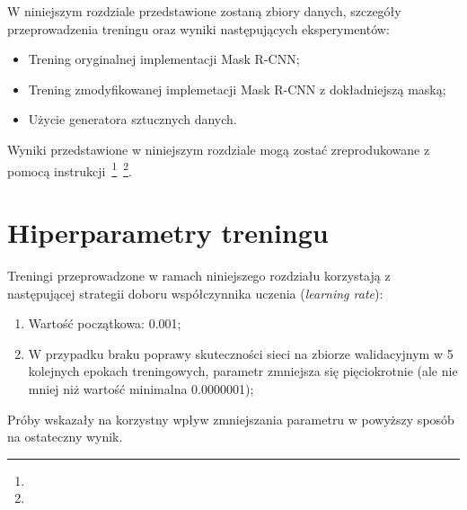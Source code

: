 
W niniejszym rozdziale przedstawione zostaną zbiory danych, szczegóły przeprowadzenia treningu oraz wyniki następujących eksperymentów:

\begin{itemize}
 \item Trening oryginalnej implementacji Mask R-CNN;
 \item Trening zmodyfikowanej implemetacji Mask R-CNN z dokładniejszą maską;
 \item Użycie generatora sztucznych danych.
\end{itemize}

Wyniki przedstawione w niniejszym rozdziale mogą zostać zreprodukowane z pomocą instrukcji~\footnote{}~\footnote{}.

\section{Hiperparametry treningu}

Treningi przeprowadzone w ramach niniejszego rozdziału korzystają z następującej strategii doboru współczynnika uczenia (\textit{learning rate}):
\begin{enumerate}
  \item Wartość początkowa: 0.001;
  \item W przypadku braku poprawy skuteczności sieci na zbiorze walidacyjnym w 5 kolejnych epokach treningowych, parametr zmniejsza się pięciokrotnie (ale nie mniej niż wartość minimalna 0.0000001);
\end{enumerate}

Próby wskazały na korzystny wpływ zmniejszania parametru w powyższy sposób na ostateczny wynik.

